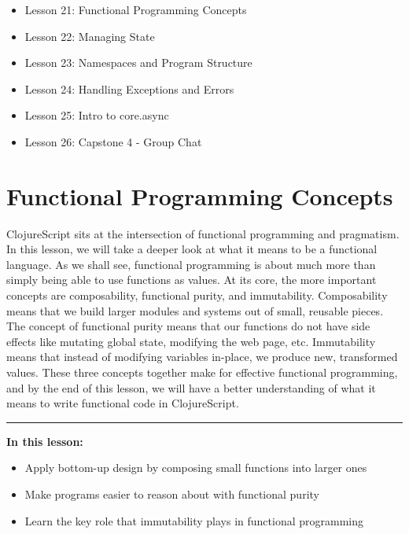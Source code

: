 \documentclass[10pt,twoside,openright]{memoir}
\begin{document}
\begin{itemize}
  \tightlist
  \item Lesson 21: Functional Programming Concepts
  \item Lesson 22: Managing State
  \item Lesson 23: Namespaces and Program Structure
  \item Lesson 24: Handling Exceptions and Errors
  \item Lesson 25: Intro to core.async
  \item Lesson 26: Capstone 4 - Group Chat
  \end{itemize}


\chapter{Functional Programming Concepts}

ClojureScript sits at the intersection of functional programming and
pragmatism. In this lesson, we will take a deeper look at what it means
to be a functional language. As we shall see, functional programming is
about much more than simply being able to use functions as values. At
its core, the more important concepts are composability, functional
purity, and immutability. Composability means that we build larger
modules and systems out of small, reusable pieces. The concept of
functional purity means that our functions do not have side effects like
mutating global state, modifying the web page, etc. Immutability means
that instead of modifying variables in-place, we produce new,
transformed values. These three concepts together make for effective
functional programming, and by the end of this lesson, we will have a
better understanding of what it means to write functional code in
ClojureScript.

\begin{center}\rule{0.5\linewidth}{0.5pt}\end{center}

\textbf{In this lesson:}

\begin{itemize}
\tightlist
\item
  Apply bottom-up design by composing small functions into larger ones
\item
  Make programs easier to reason about with functional purity
\item
  Learn the key role that immutability plays in functional programming
\end{itemize}
\end{document}
